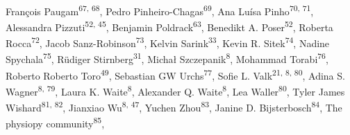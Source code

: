 \documentclass[10pt,a4paper,twocolumns]{proc}
\begin{document}
{François Paugam\textsuperscript{67, 68}, %
Pedro Pinheiro-Chagas\textsuperscript{69}, %
Ana Luísa Pinho\textsuperscript{70, 71}, %
Alessandra Pizzuti\textsuperscript{52, 45}, %
Benjamin Poldrack\textsuperscript{63}, %
Benedikt A. Poser\textsuperscript{52}, %
Roberta Rocca\textsuperscript{72}, %
Jacob Sanz-Robinson\textsuperscript{73}, %
Kelvin Sarink\textsuperscript{33}, %
Kevin R. Sitek\textsuperscript{74}, %
Nadine Spychala\textsuperscript{75}, %
Rüdiger Stirnberg\textsuperscript{31}, %
Michał Szczepanik\textsuperscript{8}, %
Mohammad Torabi\textsuperscript{76}, %
Roberto Roberto Toro\textsuperscript{49}, %
Sebastian GW Urchs\textsuperscript{77}, %
Sofie L. Valk\textsuperscript{21, 8, 80}, %
Adina S. Wagner\textsuperscript{8, 79}, %
Laura K. Waite\textsuperscript{8}, %
Alexander Q. Waite\textsuperscript{8}, %
Lea Waller\textsuperscript{80}, %
Tyler James Wishard\textsuperscript{81, 82}, %
Jianxiao Wu\textsuperscript{8, 47}, %
Yuchen Zhou\textsuperscript{83}, %
Janine D. Bijsterbosch\textsuperscript{84}, %
The physiopy community\textsuperscript{85}, %
}
\\
\end{document}
